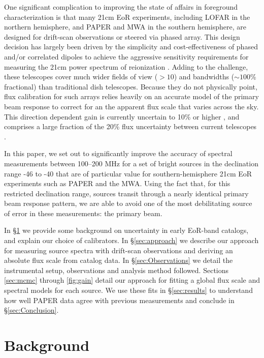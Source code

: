 \documentclass[preprint]{aastex}
\begin{document}
One significant complication to improving the state of affairs in foreground characterization
is that many 21cm EoR experiments, including LOFAR in the northern hemisphere, and
PAPER and MWA in the southern hemisphere, are designed for drift-scan observations or steered via phased array.
This design decision has largely been driven by the simplicity and cost-effectiveness of
phased and/or correlated dipoles to achieve the aggressive sensitivity requirements
for measuring the 21cm power spectrum of reionization \citep{Parsons:2012p9028,Beardsley:2012p9136,Jelic:2008p2130}.
Adding to the challenge, these telescopes 
cover much wider fields of view ($>10$\arcdeg) and bandwidths
($\sim 100$\% fractional) than traditional dish telescopes.
Because they do not physically point, flux calibration for such arrays relies heavily
on an accurate model of the primary beam response to correct for an
the apparent flux scale that varies across the sky.
This direction dependent gain is currently uncertain to 10\% or higher
\citep{Pober:2012p8800}, and comprises a large fraction of the 20\% flux uncertainty between current telescopes \citep{Jacobs:2013p9908}.


In this paper, we set out to significantly improve the accuracy of spectral measurements between 
100--200 MHz for a set of bright sources in the declination range -46\arcdeg{} to -40\arcdeg{} that
are of particular value for southern-hemisphere 21cm EoR experiments such as PAPER and the MWA.
Using the fact that, for this restricted declination range,
sources transit through a nearly identical primary beam response pattern, we are able to avoid one of the
most debilitating source of error in these measurements: the primary beam.  


In \S\ref{sec:background} we provide some background on uncertainty in early EoR-band catalogs,
and explain our choice of calibrators.
In \S\ref{sec:approach} we describe our approach for measuring source spectra with
drift-scan observations and deriving an absolute flux scale from catalog data.  
In \S\ref{sec:Observations} we detail the instrumental 
setup, observations and analysis method followed. Sections \ref{sec:mcmc} through
\ref{fig:gain} detail our approach for fitting a global flux scale and spectral models for each source.
We use these fits in \S\ref{sec:results} to understand how well PAPER data agree
with previous measurements and conclude in \S\ref{sec:Conclusion}.


\section{Background}
\label{sec:background}
\end{document}
